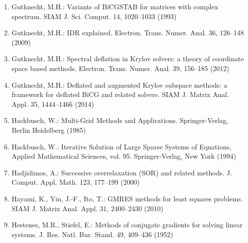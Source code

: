 \begin{enumerate}[label=\arabic*.,ref=\arabic*,leftmargin=3em]
\item\label{bib:source-87}Gutknecht, M.H.: Variants of BiCGSTAB for matrices with complex spectrum. SIAM J. Sci. Comput. 14, 1020–1033 (1993)

\item\label{bib:source-88}Gutknecht, M.H.: IDR explained. Electron. Trans. Numer. Anal. 36, 126–148 (2009)

\item\label{bib:source-89}Gutknecht, M.H.: Spectral deflation in Krylov solvers: a theory of coordinate space based methods. Electron. Trans. Numer. Anal. 39, 156–185 (2012)

\item\label{bib:source-90}Gutknecht, M.H.: Deflated and augmented Krylov subspace methods: a framework for deflated BiCG and related solvers. SIAM J. Matrix Anal. Appl. 35, 1444–1466 (2014)

\item\label{bib:source-91}Hackbusch, W.: Multi-Grid Methods and Applications. Springer-Verlag, Berlin Heidelberg (1985)

\item\label{bib:source-92}Hackbusch, W.: Iterative Solution of Large Sparse Systems of Equations, Applied Mathematical Sciences, vol. 95. Springer-Verlag, New York (1994)

\item\label{bib:source-93}Hadjidimos, A.: Successive overrelaxation (SOR) and related methods. J. Comput. Appl. Math. 123, 177–199 (2000)

\item\label{bib:source-94}Hayami, K., Yin, J.-F., Ito, T.: GMRES methods for least squares problems. SIAM J. Matrix Anal. Appl. 31, 2400–2430 (2010)

\item\label{bib:source-95}Hestenes, M.R., Stiefel, E.: Methods of conjugate gradients for solving linear systems. J. Res. Natl. Bur. Stand. 49, 409–436 (1952)


\end{enumerate}
